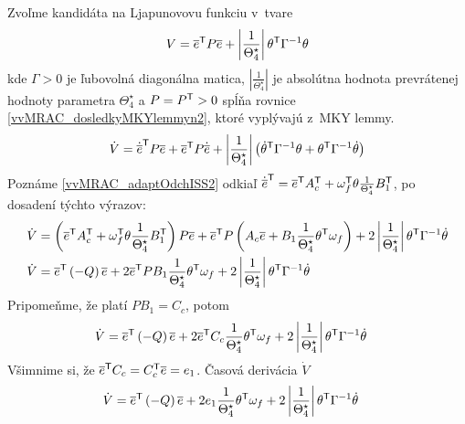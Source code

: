 ﻿\documentclass[a4paper, 10pt, ]{article}
\begin{document}
Zvoľme kandidáta na Ljapunovovu funkciu v~tvare
\begin{equation}
	V = \overline{e}^{\mathsf{T}} P \overline{e} + \left| \frac{1}{\Theta_4^\star} \right| \theta^{\mathsf{T}} \Gamma^{-1} \theta
\end{equation}
kde $\Gamma > 0$ je ľubovolná diagonálna matica, $\left| \frac{1}{\Theta_4^\star} \right|$ je absolútna hodnota prevrátenej hodnoty parametra $\Theta_4^\star$ a $P = P^{\mathsf{T}}>0$ spĺňa rovnice \eqref{vvMRAC_dosledkyMKYlemmyn2}, ktoré vyplývajú z~MKY lemmy.
\begin{equation}
	\dot{V} = \dot{\overline{e}}^{\mathsf{T}} P \overline{e} + \overline{e}^{\mathsf{T}} P \dot{\overline{e}} + \left| \frac{1}{\Theta_4^\star} \right| \left( \dot{\theta}^{\mathsf{T}} \Gamma^{-1} \theta + \theta^{\mathsf{T}} \Gamma^{-1} \dot{\theta} \right)
\end{equation}
Poznáme \eqref{vvMRAC_adaptOdchISS2} odkiaľ $ \dot{\overline{e}}^{\mathsf{T}} = \overline{e}^{\mathsf{T}} A_c^{\mathsf{T}} + \omega_f^{\mathsf{T}} \theta \frac{1}{\Theta_4^\star} B_1^{\mathsf{T}} $, po dosadení týchto výrazov:
\begin{align}
		\dot{V}
		&=
		\left(
			\overline{e}^{\mathsf{T}}
			A_c^{\mathsf{T}}
			+
			\omega_f^{\mathsf{T}}
			\theta
			\frac{1}{\Theta_4^\star}
			B_1^{\mathsf{T}}
		\right)
		P
		\overline{e}
		+
		\overline{e}^{\mathsf{T}}
		P
		\left(
			A_c
			\overline{e}
			+
			B_1
			\frac{1}{\Theta_4^\star}
			\theta^{\mathsf{T}}
			\omega_f
		\right)
		+
		2
		\left| \frac{1}{\Theta_4^\star} \right|
		\theta^{\mathsf{T}}
		\Gamma^{-1}
		\dot\theta
		\\
		\dot{V}
		&=
		\overline{e}^{\mathsf{T}}
		\left(
			-
			Q
		\right)
		\overline{e}
		+
		2
		\overline{e}^{\mathsf{T}}
		P
		B_1
		\frac{1}{\Theta_4^\star}
		\theta^{\mathsf{T}}
		\omega_f
		+
		2
		\left| \frac{1}{\Theta_4^\star} \right|
		\theta^{\mathsf{T}}
		\Gamma^{-1}
		\dot\theta
\end{align}
Pripomeňme, že platí $P B_1 = {C_c}$, potom
\begin{align}
		\dot{V}
		&=
		\overline{e}^{\mathsf{T}}
		\left(
			-
			Q
		\right)
		\overline{e}
		+
		2
		\overline{e}^{\mathsf{T}}
		C_c
		\frac{1}{\Theta_4^\star}
		\theta^{\mathsf{T}}
		\omega_f
		+
		2
		\left| \frac{1}{\Theta_4^\star} \right|
		\theta^{\mathsf{T}}
		\Gamma^{-1}
		\dot\theta
\end{align}
Všimnime si, že $\overline{e}^{\mathsf{T}} C_c = C_c^{\mathsf{T}} \overline{e} = e_1$.
Časová derivácia $\dot{V}$
\begin{align}
		\dot{V}
		&=
		\overline{e}^{\mathsf{T}}
		\left(
			-
			Q
		\right)
		\overline{e}
		+
		2
		e_1
		\frac{1}{\Theta_4^\star}
		\theta^{\mathsf{T}}
		\omega_f
		+
		2
		\left| \frac{1}{\Theta_4^\star} \right|
		\theta^{\mathsf{T}}
		\Gamma^{-1}
		\dot\theta
\end{align}
\end{document}
